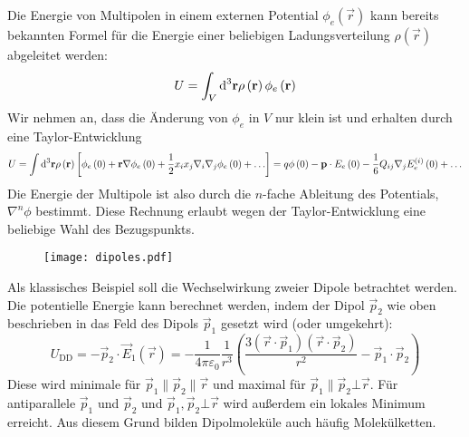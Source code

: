 Die Energie von Multipolen in einem externen Potential $\phi _{e}\left(\vec {r}\right)$ kann bereits bekannten Formel für die Energie einer beliebigen Ladungsverteilung $\rho \left(\vec {r}\right)$ abgeleitet werden:
\begin{equation*}
	U=\int _{V}\text{d} ^{3}\mathbf{r}\rho \left(\mathbf{r}\right)\phi _{e}\left(\mathbf{r}\right)
\end{equation*}
Wir nehmen an, dass die Änderung von $\phi _{e}$ in $V$ nur klein ist und erhalten durch eine Taylor-Entwicklung
\begin{equation*}
	U=\int \text{d} ^{3}\mathbf{r}\rho \left(\mathbf{r}\right)\left[\phi _{e}\left(0\right)+\mathbf{r}\nabla \phi _{e}\left(0\right)+\frac{1}{2}x_{i}x_{j}\nabla _{i}\nabla _{j}\phi _{e}\left(0\right)+\ldots \right]=q\phi \left(0\right)-\mathbf{p}\cdot E_{e}\left(0\right)-\frac{1}{6}Q_{ij}\nabla _{j}E_{e}^{\left(i\right)}\left(0\right)+\ldots
\end{equation*}
Die Energie der Multipole ist also durch die $n$-fache Ableitung des Potentials, $\nabla ^{n}\phi $ bestimmt. Diese Rechnung erlaubt wegen der Taylor-Entwicklung eine beliebige Wahl des Bezugspunkts.



\begin{figure}[htb]
	\centering
	\texttt{[image: dipoles.pdf]}
	\caption{}
	\label{fig:dipoles}
\end{figure}

Als klassisches Beispiel soll die Wechselwirkung zweier Dipole betrachtet werden. Die potentielle Energie kann berechnet werden, indem der Dipol $\vec {p}_{2}$ wie oben beschrieben in das Feld des Dipols $\vec {p}_{1}$ gesetzt wird (oder umgekehrt):
\begin{equation*}
	U_{\mathrm{DD}}=-\vec {p}_{2}\cdot \vec {E}_{1}\left(\vec {r}\right)=-\frac{1}{4\pi \varepsilon _{0}}\frac{1}{r^{3}}\left(\frac{3\left(\vec {r}\cdot \vec {p}_{1}\right)\left(\vec {r}\cdot \vec {p}_{2}\right)}{r^{2}}-\vec {p}_{1}\cdot \vec {p}_{2}\right)
\end{equation*}
Diese wird minimale für $\vec {p}_{1}\parallel \vec {p}_{2}\parallel \vec {r}$ und maximal für $\vec {p}_{1}\parallel \vec {p}_{2}\bot \vec {r}$. Für antiparallele $\vec {p}_{1}$ und $\vec {p}_{2}$ und $\vec {p}_{1},\vec {p}_{2}\bot \vec {r}$ wird außerdem ein lokales Minimum erreicht. Aus diesem Grund bilden Dipolmoleküle auch häufig Molekülketten.

